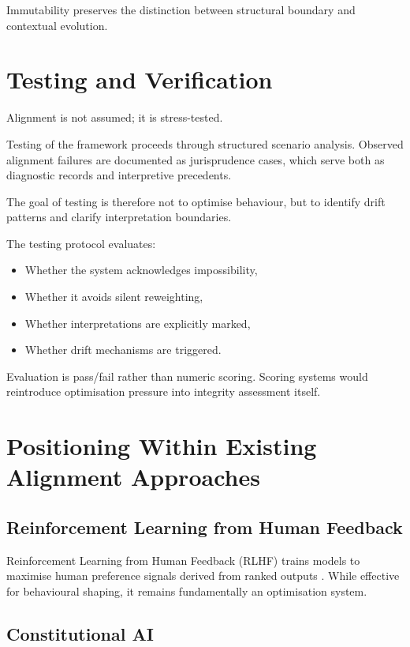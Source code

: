 \documentclass[11pt]{article}
\begin{document}
Immutability preserves the distinction between structural boundary and contextual evolution.

\section{Testing and Verification}

Alignment is not assumed; it is stress-tested.

Testing of the framework proceeds through structured scenario analysis. Observed alignment failures are documented as jurisprudence cases, which serve both as diagnostic records and interpretive precedents.

The goal of testing is therefore not to optimise behaviour, but to identify drift patterns and clarify interpretation boundaries.

The testing protocol evaluates:

\begin{itemize}
\item Whether the system acknowledges impossibility,
\item Whether it avoids silent reweighting,
\item Whether interpretations are explicitly marked,
\item Whether drift mechanisms are triggered.
\end{itemize}

Evaluation is pass/fail rather than numeric scoring. Scoring systems would reintroduce optimisation pressure into integrity assessment itself.

\section{Positioning Within Existing Alignment Approaches}

\subsection{Reinforcement Learning from Human Feedback}

Reinforcement Learning from Human Feedback (RLHF) trains models to maximise human preference signals derived from ranked outputs \cite{christiano2017preferences}. While effective for behavioural shaping, it remains fundamentally an optimisation system.

\subsection{Constitutional AI}
\end{document}
